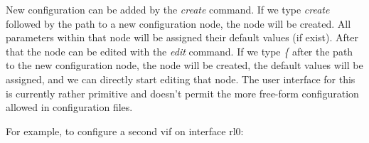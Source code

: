 New configuration can be added by the \emph{create} command.
If we type \emph{create} followed by the path to a new configuration node,
the node will be created. All parameters within that node will be assigned
their default values (if exist). After that the node can be edited with the
\emph{edit} command.
If we type \emph{\{} after the path to the new configuration node,
the node will be created, the default values will be assigned, and we can
directly start editing that node.
The user interface for this is currently rather
primitive and doesn't permit the more free-form configuration allowed
in configuration files.

\newpage
For example, to configure a second vif on interface rl0:
\vspace{0.1in}

\noindent{}

